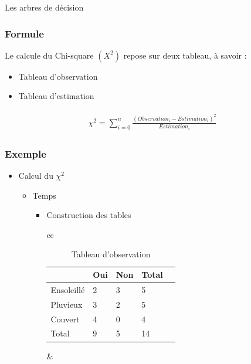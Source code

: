 \documentclass[a4paper, 11pt]{report}
\begin{document}
\begin{chapter}{Les arbres de décision}
\subsubsection*{Formule}
Le calcule du Chi-square $(X^2)$ repose sur deux tableau, à savoir :
\begin{itemize}
\item Tableau d'observation 
\item Tableau d'estimation 
\end{itemize}

\begin{align}
\begin{split}\label{ChiSquare}
   \chi ^2  = \sum_{i=0}^n \frac{(Observation_i - Estimation_i)^2}{Estimation_i}
\end{split}
\end{align}


\subsubsection*{Exemple}
\begin{itemize}
\item Calcul du $\chi^2$
\begin{itemize}
\item Temps
\begin{itemize}
\item Construction des tables 

\begin{table}[!h]
\begin{small}
\begin{tabular}{cc}

    \begin{minipage}{.5\linewidth}
   
\begin{tabular}{| l | l | l | l | l |}
\hline
\cellcolor{gray!25} & \cellcolor{gray!25}Oui & \cellcolor{gray!25}Non &\cellcolor{gray!25} Total\\
\hline
Ensoleillé & 2 & 3 & 5\\
\hline
Pluvieux & 3 & 2 & 5 \\
\hline
Couvert & 4 & 0 & 4 \\
\hline
Total & 9 & 5 & 14 \\
\hline
\end{tabular} 
      \caption{Tableau d'observation}

    \end{minipage} &


\end{tabular}
\end{small}
\end{table}
\end{itemize}
\end{itemize}
\end{itemize}
\end{chapter}
\end{document}
